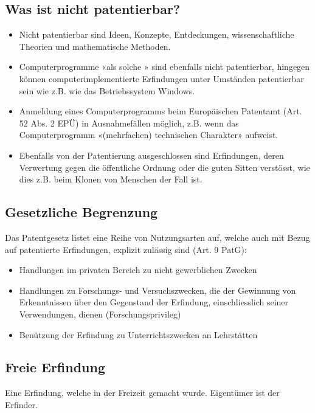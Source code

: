 \subsection{Was ist nicht patentierbar?}

\begin{itemize}
	\tightlist
	\item Nicht patentierbar sind Ideen, Konzepte, Entdeckungen,
	wissenschaftliche Theorien und mathematische Methoden.
	\item Computerprogramme «als solche » sind ebenfalls nicht patentierbar,
	hingegen können computerimplementierte Erfindungen unter Umständen
	patentierbar sein wie z.B. wie das Betriebssystem Windows.
	\item Anmeldung eines Computerprogramms beim Europäischen Patentamt (Art. 52
	Abs. 2 EPÜ) in Ausnahmefällen möglich, z.B. wenn das Computerprogramm
	«(mehrfachen) technischen Charakter» aufweist.
	\item Ebenfalls von der Patentierung ausgeschlossen sind Erfindungen, deren
	Verwertung gegen die öffentliche Ordnung oder die guten Sitten
	verstösst, wie dies z.B. beim Klonen von Menschen der Fall ist.
\end{itemize}


\subsection{Gesetzliche Begrenzung}
\label{sec:Patentrecht-Begrenzug}

Das Patentgesetz listet eine Reihe von Nutzungsarten auf, welche auch
mit Bezug auf patentierte Erfindungen, explizit zulässig sind (Art. 9
PatG):
\begin{itemize}
	\tightlist
	\item Handlungen im privaten Bereich zu nicht gewerblichen Zwecken
	\item Handlungen zu Forschungs- und Versuchszwecken, die der Gewinnung von
	Erkenntnissen über den Gegenstand der Erfindung, einschliesslich seiner
	Verwendungen, dienen (Forschungsprivileg)
	\item Benützung der Erfindung zu
	Unterrichtszwecken an Lehrstätten
\end{itemize}

\subsection{Freie Erfindung}
Eine Erfindung, welche in der Freizeit gemacht wurde. Eigentümer ist der Erfinder.

